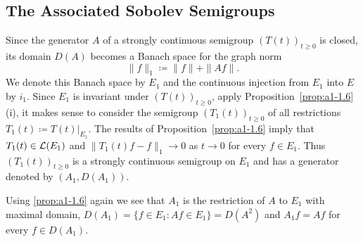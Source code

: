 \subsection{The Associated Sobolev Semigroups}\label{subsec:a1-3.6}
Since the generator $A$ of a strongly continuous semigroup $(T(t))_{t\geq 0}$ is closed, its domain $D(A)$ becomes a Banach space for the graph norm
\[
    \|f\|_{1} \coloneqq \|f\| + \|Af\| .
\]
We denote this Banach space by $E_{1}$ and the continuous injection from $E_{1}$ into $E$ by $i_{1}$.
Since $E_{1}$ is invariant under $(T(t))_{t\geq 0}$, apply Proposition~\ref{prop:a1-1.6}\,(i), it makes sense to consider the semigroup $(T_{1}(t))_{t\geq 0}$ of all restrictions $T_{1}(t) \coloneqq T(t)|_{E_{1}}$.
The results of Proposition~\ref{prop:a1-1.6} imply that $T_{1}(t) \in \mathcal{L}(E_{1})$ and $\|T_{1}(t)f-f\|_{1} \to 0$ as $t \to 0$ for every $f \in E_{1}$.
Thus $(T_{1}(t))_{t\geq 0}$ is a strongly continuous semigroup on $E_{1}$ and has a generator denoted by $(A_{1},D(A_{1}))$.

Using \ref{prop:a1-1.6} again we see that $A_{1}$ is the restriction of $A$ to $E_{1}$ with maximal domain, \ie
$D(A_{1}) = \{f \in E_{1} \colon Af \in E_{1}\} = D(A^{2})$ and
$A_{1}f = Af$ for every $f \in D(A_{1})$.

